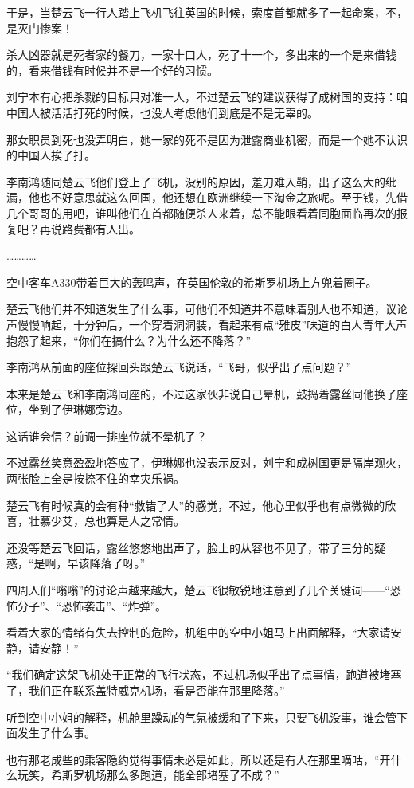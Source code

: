 于是，当楚云飞一行人踏上飞机飞往英国的时候，索度首都就多了一起命案，不，是灭门惨案！

杀人凶器就是死者家的餐刀，一家十口人，死了十一个，多出来的一个是来借钱的，看来借钱有时候并不是一个好的习惯。

刘宁本有心把杀戮的目标只对准一人，不过楚云飞的建议获得了成树国的支持：咱中国人被活活打死的时候，也没人考虑他们到底是不是无辜的。

那女职员到死也没弄明白，她一家的死不是因为泄露商业机密，而是一个她不认识的中国人挨了打。

李南鸿随同楚云飞他们登上了飞机，没别的原因，羞刀难入鞘，出了这么大的纰漏，他也不好意思就这么回国，他还想在欧洲继续一下淘金之旅呢。至于钱，先借几个哥哥的用吧，谁叫他们在首都随便杀人来着，总不能眼看着同胞面临再次的报复吧？再说路费都有人出。

…………

空中客车A330带着巨大的轰鸣声，在英国伦敦的希斯罗机场上方兜着圈子。

楚云飞他们并不知道发生了什么事，可他们不知道并不意味着别人也不知道，议论声慢慢响起，十分钟后，一个穿着洞洞装，看起来有点“雅皮”味道的白人青年大声抱怨了起来，“你们在搞什么？为什么还不降落？”

李南鸿从前面的座位探回头跟楚云飞说话，“飞哥，似乎出了点问题？”

本来是楚云飞和李南鸿同座的，不过这家伙非说自己晕机，鼓捣着露丝同他换了座位，坐到了伊琳娜旁边。

这话谁会信？前调一排座位就不晕机了？

不过露丝笑意盈盈地答应了，伊琳娜也没表示反对，刘宁和成树国更是隔岸观火，两张脸上全是按捺不住的幸灾乐祸。

楚云飞有时候真的会有种“救错了人”的感觉，不过，他心里似乎也有点微微的欣喜，壮慕少艾，总也算是人之常情。

还没等楚云飞回话，露丝悠悠地出声了，脸上的从容也不见了，带了三分的疑惑，“是啊，早该降落了呀。”

四周人们“嗡嗡”的讨论声越来越大，楚云飞很敏锐地注意到了几个关键词——“恐怖分子”、“恐怖袭击”、“炸弹”。

看着大家的情绪有失去控制的危险，机组中的空中小姐马上出面解释，“大家请安静，请安静！”

“我们确定这架飞机处于正常的飞行状态，不过机场似乎出了点事情，跑道被堵塞了，我们正在联系盖特威克机场，看是否能在那里降落。”

听到空中小姐的解释，机舱里躁动的气氛被缓和了下来，只要飞机没事，谁会管下面发生了什么事。

也有那老成些的乘客隐约觉得事情未必是如此，所以还是有人在那里嘀咕，“开什么玩笑，希斯罗机场那么多跑道，能全部堵塞了不成？”

